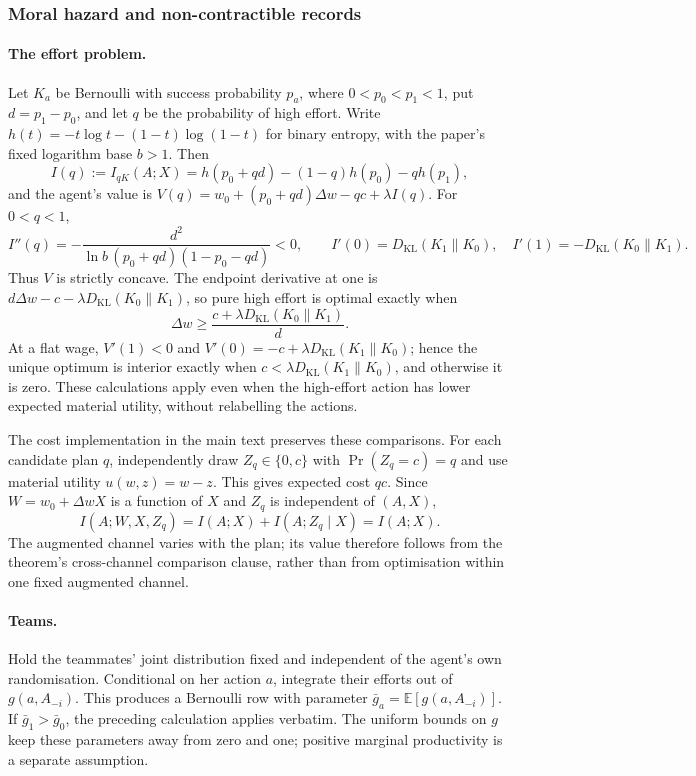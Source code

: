 \documentclass[11pt,a4paper]{article}
\theoremstyle{definition}
\newcommand{\E}{\mathbb E}
\newcommand{\I}{I}
\newcommand{\KL}{D_{\mathrm{KL}}}
\newcommand{\1}{\mathbf 1}
\begin{document}
\subsubsection{Moral hazard and non-contractible records}
\label{app:moral-hazard-proofs}

\paragraph{The effort problem.}
Let $K_a$ be Bernoulli with success probability $p_a$, where
$0<p_0<p_1<1$, put $d=p_1-p_0$, and let $q$ be the probability of high
effort.  Write $h(t)=-t\log t-(1-t)\log(1-t)$ for binary entropy, with
the paper's fixed logarithm base $b>1$.  Then
\[
 I(q):=\I_{qK}(A;X)
 =h(p_0+qd)-(1-q)h(p_0)-qh(p_1),
\]
and the agent's value is
$V(q)=w_0+(p_0+qd)\Delta w-qc+\lambda I(q)$.
For $0<q<1$,
\[
 I''(q)=-\frac{d^2}{\ln b\,(p_0+qd)(1-p_0-qd)}<0,
 \qquad
 I'(0)=\KL(K_1\|K_0),\quad
 I'(1)=-\KL(K_0\|K_1).
\]
Thus $V$ is strictly concave.  The endpoint derivative at one is
$d\Delta w-c-\lambda\KL(K_0\|K_1)$, so pure high effort is optimal
exactly when
\[
 \Delta w\ge\frac{c+\lambda\KL(K_0\|K_1)}d.
\]
At a flat wage, $V'(1)<0$ and
$V'(0)=-c+\lambda\KL(K_1\|K_0)$; hence the unique optimum is interior
exactly when $c<\lambda\KL(K_1\|K_0)$, and otherwise it is zero.
These calculations apply even when the high-effort action has lower
expected material utility, without relabelling the actions.

The cost implementation in the main text preserves these comparisons.
For each candidate plan $q$, independently draw $Z_q\in\{0,c\}$ with
$\Pr(Z_q=c)=q$ and use material utility $u(w,z)=w-z$.
This gives expected cost $qc$.  Since $W=w_0+\Delta wX$ is a function
of $X$ and $Z_q$ is independent of $(A,X)$,
\[
 \I(A;W,X,Z_q)=\I(A;X)+\I(A;Z_q\mid X)=\I(A;X).
\]
The augmented channel varies with the plan; its value therefore follows
from the theorem's cross-channel comparison clause, rather than from
optimisation within one fixed augmented channel.

\paragraph{Teams.}
Hold the teammates' joint distribution fixed and independent of the
agent's own randomisation.  Conditional on her action $a$, integrate their
efforts out of $g(a,A_{-i})$.  This produces a Bernoulli row with parameter
$\bar g_a=\E[g(a,A_{-i})]$.  If $\bar g_1>\bar g_0$, the preceding
calculation applies verbatim.  The uniform bounds on $g$ keep these
parameters away from zero and one; positive marginal productivity is a
separate assumption.
\end{document}
